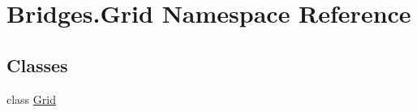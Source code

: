 \hypertarget{namespace_bridges_1_1_grid}{}\section{Bridges.\+Grid Namespace Reference}
\label{namespace_bridges_1_1_grid}
\subsection*{Classes}
\begin{DoxyCompactItemize}
\item 
class \hyperlink{class_bridges_1_1_grid_1_1_grid}{Grid}
\end{DoxyCompactItemize}
